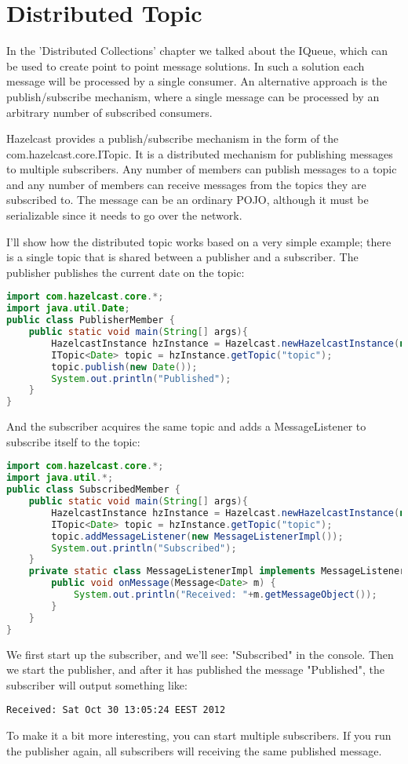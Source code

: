\chapter{Distributed Topic}
In the 'Distributed Collections' chapter we talked about the IQueue, which can be used to create point to point message solutions. In such a solution each message will be processed by a single consumer. An alternative approach is the publish/subscribe mechanism, where a single message can be processed by an arbitrary number of subscribed consumers.

Hazelcast provides a publish/subscribe mechanism in the form of the com.hazelcast.core.ITopic. It is a distributed mechanism for publishing messages to multiple subscribers. Any number of members can publish messages to a topic and any number of members can receive messages from the topics they are subscribed to. The message can be an ordinary POJO, although it must be serializable since it needs to go over the network.

I'll show how the distributed topic works based on a very simple example; there is a single topic that is shared between a publisher and a subscriber. The publisher publishes the current date on the topic:
\begin{lstlisting}[language=java]
import com.hazelcast.core.*;
import java.util.Date;
public class PublisherMember {
    public static void main(String[] args){
        HazelcastInstance hzInstance = Hazelcast.newHazelcastInstance(null);
        ITopic<Date> topic = hzInstance.getTopic("topic");
        topic.publish(new Date());
        System.out.println("Published");
    }
}
\end{lstlisting}
And the subscriber acquires the same topic and adds a MessageListener to subscribe itself to the topic:
\begin{lstlisting}[language=java]
import com.hazelcast.core.*;
import java.util.*;
public class SubscribedMember {
    public static void main(String[] args){
        HazelcastInstance hzInstance = Hazelcast.newHazelcastInstance(null);
        ITopic<Date> topic = hzInstance.getTopic("topic");
        topic.addMessageListener(new MessageListenerImpl());
        System.out.println("Subscribed");
    }
    private static class MessageListenerImpl implements MessageListener<Date> {
        public void onMessage(Message<Date> m) {
            System.out.println("Received: "+m.getMessageObject());
        }
    }
}
\end{lstlisting}
We first start up the subscriber, and we'll see: "Subscribed" in the console. Then we start the publisher, and after it has published the message "Published", the subscriber will output something like:
\begin{lstlisting}
Received: Sat Oct 30 13:05:24 EEST 2012
\end{lstlisting}
To make it a bit more interesting, you can start multiple subscribers. If you run the publisher again, all subscribers will receiving the same published message.

